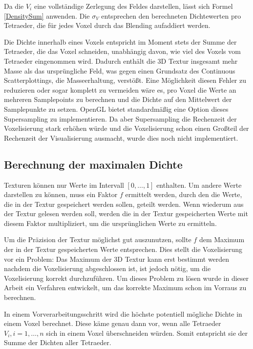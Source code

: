 \documentclass[a4paper,fontsize=12pt,toc=bib,halfparskip]{scrartcl}
\begin{document}
Da die $V_i$ eine vollst\"andige Zerlegung des Feldes darstellen, l\"asst sich Formel \ref{DensitySum} anwenden. Die $\sigma_V$ entsprechen den berechneten Dichtewerten pro Tetraeder, die f\"ur jedes Voxel durch das Blending aufaddiert werden.

Die Dichte innerhalb eines Voxels entspricht im Moment stets der Summe der Tetraeder, die das Voxel schneiden, unabh\"angig davon, wie viel des Voxels vom Tetraeder eingenommen wird. Dadurch enth\"alt die 3D Textur insgesamt mehr Masse als das urspr\"ungliche Feld, was gegen einen Grundsatz des Continuous Scatterplottings, die Masseerhaltung, verst\"o{\ss}t. Eine M\"oglichkeit diesen Fehler zu reduzieren oder sogar komplett zu vermeiden w\"are es, pro Voxel die Werte an mehreren Samplepoints zu berechnen und die Dichte auf den Mittelwert der Samplepunkte zu setzen. OpenGL bietet standardm\"a{\ss}ig eine Option dieses Supersampling zu implementieren. Da aber Supersampling die Rechenzeit der Voxelisierung stark erh\"ohen w\"urde und die Voxelisierung schon einen Gro{\ss}teil der Rechenzeit der Visualisierung ausmacht, wurde dies noch nicht implementiert.

\subsection{Berechnung der maximalen Dichte}
Texturen k\"onnen nur Werte im Intervall $[0,\dots,1]$ enthalten. Um andere Werte darstellen zu k\"onnen, muss ein Faktor $f$ ermittelt werden, durch den die Werte, die in der Textur gespeichert werden sollen, geteilt werden. Wenn wiederum aus der Textur gelesen werden soll, werden die in der Textur gespeicherten Werte mit diesem Faktor multipliziert, um die urspr\"unglichen Werte zu ermitteln.

Um die Pr\"azision der Textur m\"oglichst gut auszunutzen, sollte $f$ dem Maximum der in der Textur gespeicherten Werte entsprechen. Dies stellt die Voxelisierung vor ein Problem: Das Maximum der 3D Textur kann erst bestimmt werden nachdem die Voxelisierung abgeschlossen ist, ist jedoch n\"otig, um die Voxelisierung korrekt durchzuf\"uhren. Um dieses Problem zu l\"osen wurde in dieser Arbeit ein Verfahren entwickelt, um das korrekte Maximum schon im Vorraus zu berechnen.

In einem Vorverarbeitungsschritt wird die h\"ochste potentiell m\"ogliche Dichte in einem Voxel berechnet. Diese k\"ame genau dann vor, wenn alle Tetraeder $V_i, i=1,\dots,n$ sich in einem Voxel \"uberschneiden w\"urden. Somit entspricht sie der Summe der Dichten aller Tetraeder. 
\end{document}
